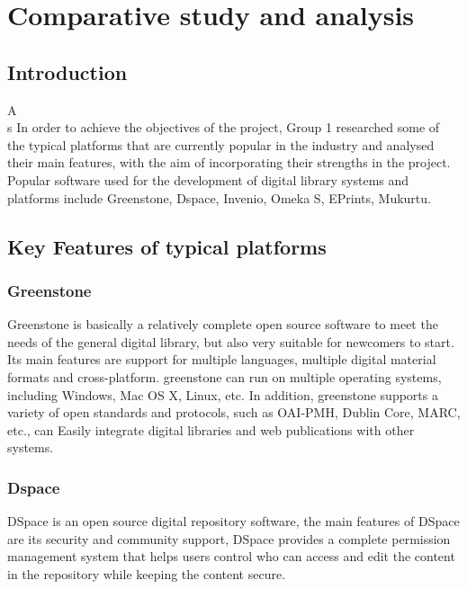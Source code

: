 \chapter{Comparative study and analysis}

\section*{Introduction}

\lettrine[lines=2]{A}\\s In order to achieve the objectives of the project, Group 1 researched some of the typical platforms that are currently popular in the industry and analysed their main features, with the aim of incorporating their strengths in the project. Popular software used for the development of digital library systems and platforms include Greenstone, Dspace, Invenio, Omeka S, EPrints, Mukurtu.

\section{Key Features of typical platforms}

\subsection{Greenstone}

Greenstone is basically a relatively complete open source software to meet the needs of the general digital library, but also very suitable for newcomers to start. Its main features are support for multiple languages, multiple digital material formats and cross-platform. greenstone can run on multiple operating systems, including Windows, Mac OS X, Linux, etc. In addition, greenstone supports a variety of open standards and protocols, such as OAI-PMH, Dublin Core, MARC, etc., can Easily integrate digital libraries and web publications with other systems\cite{WelcomeG98:online}.



\subsection{Dspace}

DSpace is an open source digital repository software, the main features of DSpace are its security and community support, DSpace provides a complete permission management system that helps users control who can access and edit the content in the repository while keeping the content secure\cite{DSpaceIn88:online}. 

